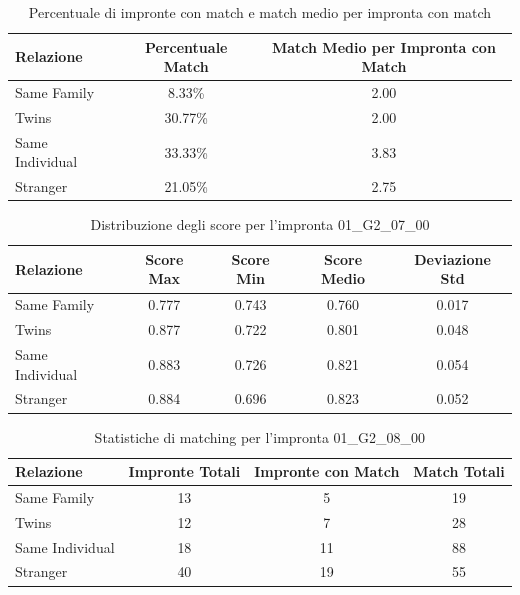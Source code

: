 \begin{table}[htbp]
\centering
\caption{Percentuale di impronte con match e match medio per impronta con match}
\label{tab:match_percentage_01_G2_07_00}
\begin{tabular}{|l|c|c|}
\hline
\textbf{Relazione} & \textbf{Percentuale Match} & \textbf{Match Medio per Impronta con Match} \\
\hline
Same Family & 8.33\% & 2.00 \\
\hline
Twins & 30.77\% & 2.00 \\
\hline
Same Individual & 33.33\% & 3.83 \\
\hline
Stranger & 21.05\% & 2.75 \\
\hline
\end{tabular}
\end{table}


\begin{table}[htbp]
\centering
\caption{Distribuzione degli score per l'impronta 01\_G2\_07\_00}
\label{tab:scores_01_G2_07_00}
\begin{tabular}{|l|c|c|c|c|}
\hline
\textbf{Relazione} & \textbf{Score Max} & \textbf{Score Min} & \textbf{Score Medio} & \textbf{Deviazione Std} \\
\hline
Same Family & 0.777 & 0.743 & 0.760 & 0.017 \\
\hline
Twins & 0.877 & 0.722 & 0.801 & 0.048 \\
\hline
Same Individual & 0.883 & 0.726 & 0.821 & 0.054 \\
\hline
Stranger & 0.884 & 0.696 & 0.823 & 0.052 \\
\hline
\end{tabular}
\end{table}


\begin{table}[htbp]
\centering
\caption{Statistiche di matching per l'impronta 01\_G2\_08\_00}
\label{tab:results_01_G2_08_00}
\begin{tabular}{|l|c|c|c|}
\hline
\textbf{Relazione} & \textbf{Impronte Totali} & \textbf{Impronte con Match} & \textbf{Match Totali} \\
\hline
Same Family & 13 & 5 & 19 \\
\hline
Twins & 12 & 7 & 28 \\
\hline
Same Individual & 18 & 11 & 88 \\
\hline
Stranger & 40 & 19 & 55 \\
\hline
\end{tabular}
\end{table}


